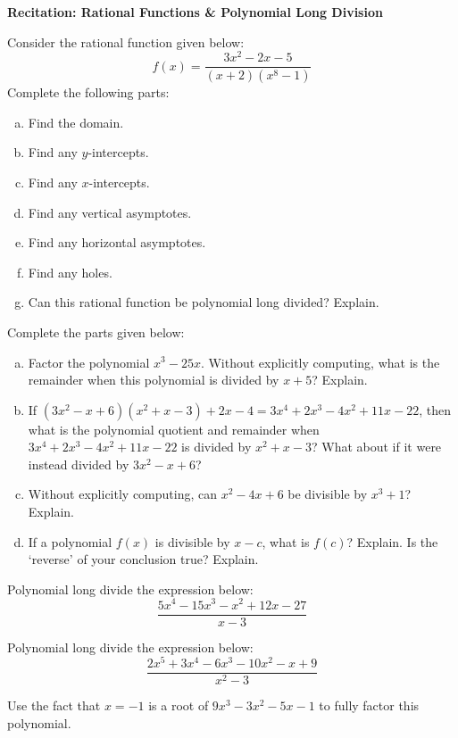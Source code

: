 \documentclass[11pt,letterpaper]{article}
\begin{document}

\phantom{} \hfill {\bfseries \Large Recitation: Rational Functions \& Polynomial Long Division} \hfill \phantom{} \par\vspace{0.5cm}

 Consider the rational function given below:
	\[
	f(x)= \dfrac{3x^2 - 2x - 5}{(x + 2)(x^8 - 1)}
	\]
Complete the following parts:
	\begin{enumerate}[(a)]
	\item Find the domain.
	\item Find any $y$-intercepts.
	\item Find any $x$-intercepts.
	\item Find any vertical asymptotes. 
	\item Find any horizontal asymptotes.
	\item Find any holes.
	\item Can this rational function be polynomial long divided? Explain.
	\end{enumerate} \vfill



 Complete the parts given below:
	\begin{enumerate}[(a)]
	\item Factor the polynomial $x^3 - 25x$. Without explicitly computing, what is the remainder when this polynomial is divided by $x + 5$? Explain.
	\item If $(3x^2 - x + 6) (x^2 + x - 3) + 2 x - 4= 3x^4 + 2x^3 - 4x^2 + 11x - 22$, then what is the polynomial quotient and remainder when $3x^4 + 2x^3 - 4x^2 + 11x - 22$ is divided by $x^2 + x - 3$? What about if it were instead divided by $3x^2 - x + 6$?
	\item Without explicitly computing, can $x^2 - 4x + 6$ be divisible by $x^3 + 1$? Explain. 
	\item If a polynomial $f(x)$ is divisible by $x - c$, what is $f(c)$? Explain. Is the `reverse' of your conclusion true? Explain.
	\end{enumerate}  \vfill



\newpage



 Polynomial long divide the expression below:
	\[
	\dfrac{5x^4 - 15x^3 - x^2 + 12x - 27}{x - 3}
	\] \par\vspace{6cm}



 Polynomial long divide the expression below:
	\[
	\dfrac{2x^5 + 3x^4 - 6x^3 - 10x^2 - x + 9}{x^2 - 3}
	\] \par\vspace{6cm}



 Use the fact that $x= -1$ is a root of $9x^3 - 3x^2 - 5x - 1$ to fully factor this polynomial. \par\vspace{6cm} 
\end{document}

